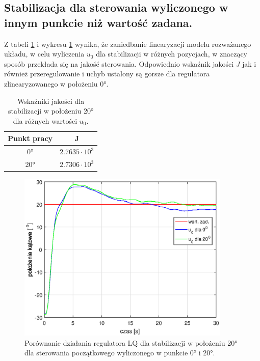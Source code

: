 \documentclass[11pt,a4paper]{article}
\begin{document}
\subsection{Stabilizacja dla sterowania wyliczonego w innym punkcie niż wartość zadana.}
Z tabeli \ref{por_reg_LQ_u0} i wykresu \ref{fig:por_LQ9_u} wynika, że zaniedbanie linearyzacji modelu rozważanego układu, w celu wyliczenia $u_0$ dla stabilizacji w różnych pozycjach, w znaczący sposób przekłada się na jakość sterowania. Odpowiednio wskaźnik jakości \textit{J} jak i również przeregulowanie i uchyb ustalony są gorsze dla regulatora zlinearyzowanego w położeniu \ang{0}. 
\begin{table}[ht]
	\caption{Wskaźniki jakości dla stabilizacji w położeniu \ang{20} dla różnych wartości $u_0$.}
	\label{por_reg_LQ_u0}
	\centering
	
	\begin{tabular}{|c|c|}
		\hline
		Punkt pracy &J\\
		\hline
		\ang{0} & $2.7635 \cdot 10 ^3$\\
		\hline
		\ang{20} & $2.7306 \cdot 10 ^3$\\
		\hline
	\end{tabular}
\end{table}

\begin{figure}[H]
	\centering
	\includegraphics[width=4in]{Figures/porLQ9_u.eps}
	\caption{Porównanie działania regulatora LQ dla stabilizacji w położeniu \ang{20} dla sterowania początkowego wyliczonego w punkcie \ang{0} i \ang{20}.}
	\label{fig:por_LQ9_u}
\end{figure}

%
\end{document}
